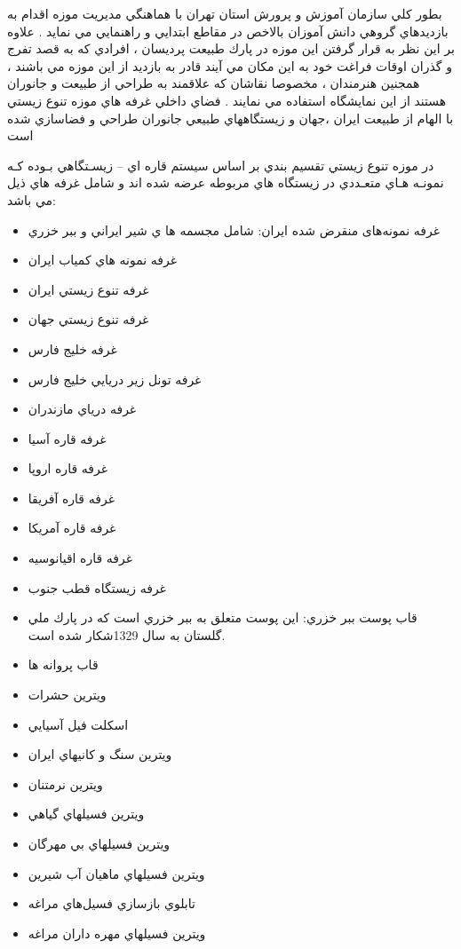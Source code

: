 بطور كلي سازمان آموزش و پرورش استان تهران با هماهنگي مديريت موزه اقدام به بازديدهاي گروهي دانش
آموزان بالاخص در مقاطع ابتدايي و راهنمايي مي نمايد . علاوه بر اين نظر به قرار گرفتن اين موزه در پارك
طبيعت پرديسان ، افرادي كه به قصد تفرج و گذران اوقات فراغت خود به اين مكان مي آيند قادر به بازديد از
اين موزه مي باشند ، همجنين هنرمندان ، مخصوصا نقاشان كه علاقمند به طراحي از طبيعت و جانوران
هستند از اين نمايشگاه استفاده مي نمايند . فضاي داخلي غرفه هاي موزه تنوع زيستي با الهام از طبيعت ايران
،جهان و زيستگاههاي طبيعي جانوران طراحي و فضاسازي شده است

در موزه تنوع زيستي تقسيم بندي بر اساس سيستم قاره اي – زيسـتگاهي بـوده كـه نمونـه هـاي متعـددي در
زيستگاه هاي مربوطه عرضه شده اند و شامل غرفه هاي ذيل مي باشد:

\begin{itemize}
    \item غرفه نمونه‌های منقرض شده ايران: شامل مجسمه ها ي شير ايراني و ببر خزري
    \item غرفه نمونه هاي كمياب ايران
    \item غرفه تنوع زيستي ايران
    \item غرفه تنوع زيستي جهان
    \item غرفه خليج فارس
    \item غرفه تونل زير دريايي خليج فارس
    \item غرفه درياي مازندران
    \item غرفه قاره آسيا
    \item غرفه قاره اروپا
    \item غرفه قاره آفريقا
    \item غرفه قاره آمريكا
    \item غرفه قاره اقيانوسيه
    \item غرفه زيستگاه قطب جنوب
    \item قاب پوست ببر خزري: اين پوست متعلق به ببر خزري است كه در پارك ملي گلستان به سال 1329شكار شده است.
    \item قاب پروانه ها
    \item ويترين حشرات
    \item اسكلت فيل آسيايي
    \item ويترين سنگ و كانيهاي ايران
    \item ويترين نرمتنان
    \item ويترين فسيلهاي گياهي
    \item ويترين فسيلهاي بي مهرگان
    \item ويترين فسيلهاي ماهيان آب شيرين
    \item تابلوي بازسازي فسيل‌هاي مراغه
    \item ويترين فسيلهاي مهره داران مراغه
\end{itemize}


